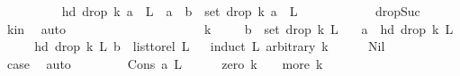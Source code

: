\begin{isabellebody}
\ \ \ \ \ \ \ \ \isamarkupfalse%
\ {\isachardoublequoteopen}hd\ {\isacharparenleft}{\kern0pt}drop\ {\isacharquery}{\kern0pt}k\ {\isacharparenleft}{\kern0pt}a{}\ {\isacharhash}{\kern0pt}\ L{\isacharparenright}{\kern0pt}{\isacharparenright}{\kern0pt}\ {\isacharequal}{\kern0pt}\ a\ {\isasymand}\ b\ {\isasymin}\ set\ {\isacharparenleft}{\kern0pt}drop\ {\isacharquery}{\kern0pt}k\ {\isacharparenleft}{\kern0pt}a{}\ {\isacharhash}{\kern0pt}\ L{\isacharparenright}{\kern0pt}{\isacharparenright}{\kern0pt}{\isachardoublequoteclose}\isanewline
\ \ \ \ \ \ \ \ \ \ \isamarkupfalse%
\ drop{\isacharunderscore}{\kern0pt}Suc\ \isamarkupfalse%
\ k{\isacharunderscore}{\kern0pt}in\ \isamarkupfalse%
\ auto\ \isanewline
\ \ \ \ \ \ \isamarkupfalse%
\isanewline
\ \ \isamarkupfalse%
\isanewline
\ \ \ \ \isamarkupfalse%
\isanewline
\ \ \isamarkupfalse%
\isanewline
\ \ \isamarkupfalse%
\ k\ \isanewline
\ \ \isamarkupfalse%
\ {\isachardoublequoteopen}b\ {\isasymin}\ set\ {\isacharparenleft}{\kern0pt}drop\ k\ L{\isacharparenright}{\kern0pt}{\isachardoublequoteclose}\isanewline
\ \ \ {\isachardoublequoteopen}a\ {\isacharequal}{\kern0pt}\ hd\ {\isacharparenleft}{\kern0pt}drop\ k\ L{\isacharparenright}{\kern0pt}{\isachardoublequoteclose}\isanewline
\ \ \isamarkupfalse%
\ \isamarkupfalse%
\ {\isachardoublequoteopen}{\isacharparenleft}{\kern0pt}hd\ {\isacharparenleft}{\kern0pt}drop\ k\ L{\isacharparenright}{\kern0pt}{\isacharcomma}{\kern0pt}\ b{\isacharparenright}{\kern0pt}\ {\isasymin}\ list{\isacharunderscore}{\kern0pt}to{\isacharunderscore}{\kern0pt}rel\ L{\isachardoublequoteclose}\isanewline
\ \ \isamarkupfalse%
{\isacharparenleft}{\kern0pt}induct\ L\ arbitrary{\isacharcolon}{\kern0pt}\ k{\isacharparenright}{\kern0pt}\isanewline
\ \ \ \ \isamarkupfalse%
\ Nil\isanewline
\ \ \ \ \isamarkupfalse%
\ \isamarkupfalse%
\ {\isacharquery}{\kern0pt}case\ \isamarkupfalse%
\ auto\isanewline
\ \ \isamarkupfalse%
\isanewline
\ \ \ \ \isamarkupfalse%
\ {\isacharparenleft}{\kern0pt}Cons\ a\ L{\isacharparenright}{\kern0pt}\isanewline
\ \ \ \ \isamarkupfalse%
\ {\isacharparenleft}{\kern0pt}zero{\isacharparenright}{\kern0pt}\ {\isachardoublequoteopen}k\ {\isacharequal}{\kern0pt}\ {}{\isachardoublequoteclose}\ {\isacharbar}{\kern0pt}\ {\isacharparenleft}{\kern0pt}more{\isacharparenright}{\kern0pt}\ {\isachardoublequoteopen}k\ {\isachargreater}{\kern0pt}\ {}{\isachardoublequoteclose}\ \isamarkupfalse%

\end{isabellebody}
